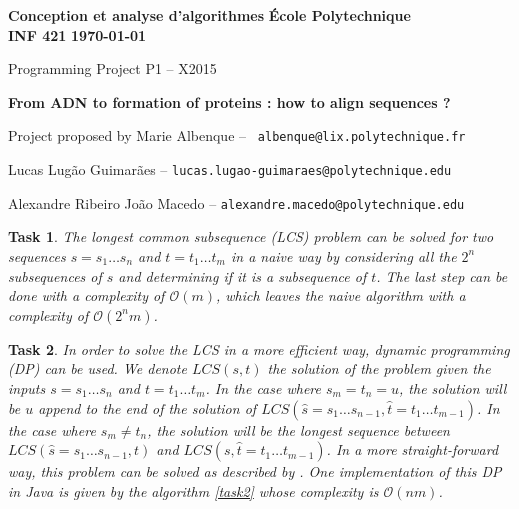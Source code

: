\documentclass[10pt]{article} %
\theoremstyle{problemstyle}
\newtheorem{exercise}{Task}	%
\renewcommand*{\O}{\mathcal{O}}
\begin{document}
\noindent
\normalsize\textbf{Conception et analyse d'algorithmes} \hfill \textbf{École Polytechnique}\\
\normalsize\textbf{INF 421} \hfill \textbf{\today}\vspace{20pt}
\centerline{\Large Programming Project P1 – X2015}\vspace{5pt}
\centerline{\Large \textbf{From ADN to formation of proteins : how to align sequences ?}}\vspace{3pt}
\centerline{Project proposed by Marie Albenque -- \texttt{ albenque@lix.polytechnique.fr}}\vspace{13pt}
\centerline{Lucas Lugão Guimarães -- \texttt{lucas.lugao-guimaraes@polytechnique.edu}}
\centerline{Alexandre Ribeiro João Macedo --  \texttt{alexandre.macedo@polytechnique.edu}}\vspace{20pt}


\begin{exercise} %
The longest common subsequence (LCS) problem can be solved for two sequences $s=s_1\dots s_n$ and $t=t_1\dots t_m$ in a naive way by considering all the $2^{n}$ subsequences of $s$ and determining if it is a subsequence of $t$. The last step can be done with a complexity of $\O(m)$, which leaves the naive algorithm with a complexity of $\O(2^{n}m)$.
\end{exercise}

\begin{exercise} %
In order to solve the LCS in a more efficient way, dynamic programming (DP) can be used. We denote $LCS(s,t)$ the solution of the problem given the inputs $s=s_1\dots s_n$ and $t=t_1\dots t_m$. In the case where $s_m = t_n = u$, the solution will be $u$ append to the end of the solution of $LCS(\hat{s}=s_1\dots s_{n-1}, \hat{t}=t_1\dots t_{m-1})$. In the case where $s_m \neq t_n$, the solution will be the longest sequence between $LCS(\hat{s}=s_1\dots s_{n-1}, t)$ and $LCS(s, \hat{t}=t_1\dots t_{m-1})$. In a more straight-forward way, this problem can be solved as described by \cite{jones}. One implementation of this DP in Java is given by the algorithm \ref{task2} whose complexity is $\O(nm)$.
\begin{comment}
This solution consists of filling two matrices $A_{n+1,m+1}$ and $B_{n+1,m+1}$, following the given rules: initialize the first line and the first column of $A$ in zeros, fill this matrix according to 
\begin{align*}
A_{i,j}
\end{align*}
\end{comment}


\end{exercise}
\end{document}
